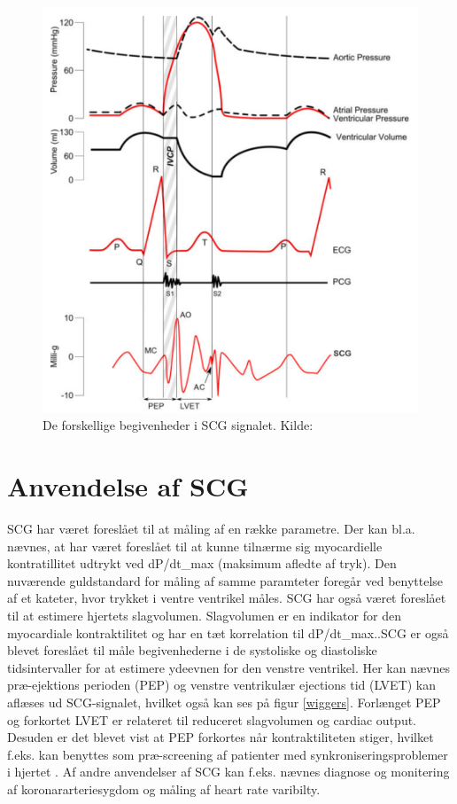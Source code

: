 \begin{figure}\label{fig:wigger}
\includegraphics[scale=1]{figures/wigger.PNG}
\caption{De forskellige begivenheder i SCG signalet. Kilde: \citep{zanetti}}
\end{figure}

\section{Anvendelse af SCG}
SCG har været foreslået til at måling af en række parametre. Der kan bl.a. nævnes, at har været foreslået til at kunne tilnærme sig myocardielle kontratillitet udtrykt ved dP/dt_max (maksimum afledte af tryk). Den nuværende guldstandard for måling af samme paramteter foregår ved benyttelse af et kateter, hvor trykket i ventre ventrikel måles. SCG har også været foreslået til at estimere hjertets slagvolumen. Slagvolumen er en indikator for den myocardiale kontraktilitet og har en tæt korrelation til dP/dt_max..SCG er også blevet foreslået til måle begivenhederne i de systoliske og diastoliske tidsintervaller for at estimere ydeevnen for den venstre ventrikel. Her kan nævnes  præ-ejektions perioden (PEP) og venstre ventrikulær ejections tid (LVET) kan aflæses ud SCG-signalet, hvilket også kan ses på figur \ref{wiggers}. Forlænget PEP og forkortet LVET er relateret til reduceret slagvolumen og cardiac output. Desuden er det blevet vist at PEP forkortes når kontraktiliteten stiger, hvilket f.eks. kan benyttes som præ-screening af patienter med synkroniseringsproblemer i hjertet  \cite{Zanetti}  \cite{abra}. Af andre anvendelser af SCG kan f.eks. nævnes diagnose og monitering af koronararteriesygdom og måling af heart rate varibilty.

